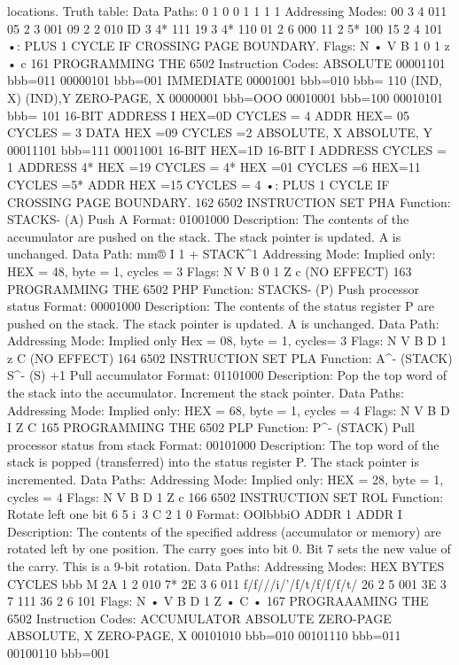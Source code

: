 locations.
Truth table:
Data Paths:
0
1
0
0
1
1
1
1
Addressing Modes:
00
3
4
011
05
2
3
001
09
2
2
010
ID
3
4*
111
19
3
4*
110
01
2
6
000
11
2
5*
100
15
2
4
101
•: PLUS 1 CYCLE IF CROSSING PAGE BOUNDARY.
Flags:
N
•
V B
1
0 1 z
•
c
161
PROGRAMMING THE 6502
Instruction Codes:
ABSOLUTE 00001101
bbb=011
00000101
bbb=001
IMMEDIATE 00001001
bbb=010
bbb= 110
(IND, X)
(IND),Y
ZERO-PAGE, X
00000001
bbb=OOO
00010001
bbb=100
00010101
bbb= 101
16-BIT ADDRESS
I
HEX=0D CYCLES = 4
ADDR
HEX= 05 CYCLES = 3
DATA
HEX =09 CYCLES =2
ABSOLUTE, X
ABSOLUTE, Y
00011101
bbb=111
00011001
16-BIT
HEX=1D
16-BIT
I
ADDRESS
CYCLES =
1
ADDRESS
4*
HEX =19 CYCLES = 4*
HEX =01 CYCLES =6
HEX=11 CYCLES =5*
ADDR
HEX =15 CYCLES = 4
•: PLUS 1 CYCLE IF CROSSING PAGE BOUNDARY.
162
6502 INSTRUCTION SET
PHA
Function:
STACKS- (A)
Push A
Format: 01001000
Description:
The contents of the accumulator are pushed on the stack. The
stack pointer is updated. A is unchanged.
Data Path:
mm®
I
1
+
STACK^1
Addressing Mode:
Implied only:
HEX = 48, byte = 1, cycles = 3
Flags:
N V B 0 1 Z c
(NO EFFECT)
163
PROGRAMMING THE 6502
PHP
Function:
STACKS- (P)
Push processor status
Format: 00001000
Description:
The contents of the status register P are pushed on the stack.
The stack pointer is updated. A is unchanged.
Data Path:
Addressing Mode:
Implied only
Hex = 08, byte = 1, cycles= 3
Flags:
N V B D 1 z C
(NO EFFECT)
164
6502 INSTRUCTION SET
PLA
Function:
A^- (STACK)
S^- (S) +1
Pull accumulator
Format: 01101000
Description:
Pop the top word of the stack into the accumulator. Increment
the stack pointer.
Data Paths:
Addressing Mode:
Implied only:
HEX = 68, byte = 1, cycles = 4
Flags:
N V B D I Z C
165
PROGRAMMING THE 6502
PLP
Function:
P^- (STACK)
Pull processor status from stack
Format: 00101000
Description:
The top word of the stack is popped (transferred) into the status
register P. The stack pointer is incremented.
Data Paths:
Addressing Mode:
Implied only:
HEX = 28, byte = 1, cycles = 4
Flags:
N V B D 1 Z c
166
6502 INSTRUCTION SET
ROL
Function:
Rotate left one bit
6 5 i\ 3
C
2 1 0
Format: OOlbbbiO ADDR
1
ADDR I
Description:
The contents of the specified address (accumulator or memory)
are rotated left by one position. The carry goes into bit 0. Bit 7
sets the new value of the carry. This is a 9-bit rotation.
Data Paths:
Addressing Modes:
HEX
BYTES
CYCLES
bbb
M
2A
1
2
010
7*
2E
3
6
011
f/f///i/'/f/t/f/f/f/t/
26
2
5
001
3E
3
7
111
36
2
6
101
Flags:
N
•
V B D 1 Z
•
C
•
167
PROGRAAAMING THE 6502
Instruction Codes:
ACCUMULATOR
ABSOLUTE
ZERO-PAGE
ABSOLUTE, X
ZERO-PAGE, X
00101010
bbb=010
00101110
bbb=011
00100110
bbb=001
